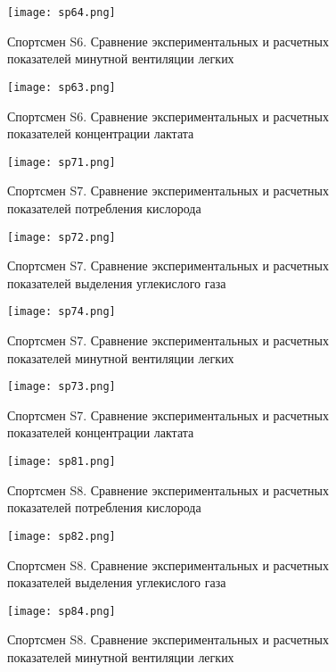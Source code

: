 \begin{figure}[!ht]
	\centering
	\texttt{[image: sp64.png]}
	\caption{Спортсмен S6. Сравнение экспериментальных и расчетных показателей минутной вентиляции легких} 
\end{figure}

\begin{figure}[!ht]
	\centering
	\texttt{[image: sp63.png]}
	\caption{Спортсмен S6. Сравнение экспериментальных и расчетных показателей концентрации лактата} 
\end{figure}

\begin{figure}[!ht]
	\centering
	\texttt{[image: sp71.png]}
	\caption{Спортсмен S7. Сравнение экспериментальных и расчетных показателей потребления кислорода } 
\end{figure}

\begin{figure}[!ht]
	\centering
	\texttt{[image: sp72.png]}
	\caption{Спортсмен S7. Сравнение экспериментальных и расчетных показателей выделения углекислого газа} 
\end{figure}

\begin{figure}[!ht]
	\centering
	\texttt{[image: sp74.png]}
	\caption{Спортсмен S7. Сравнение экспериментальных и расчетных показателей минутной вентиляции легких} 
\end{figure}

\begin{figure}[!ht]
	\centering
	\texttt{[image: sp73.png]}
	\caption{Спортсмен S7. Сравнение экспериментальных и расчетных показателей концентрации лактата} 
\end{figure}

\begin{figure}[!ht]
	\centering
	\texttt{[image: sp81.png]}
	\caption{Спортсмен S8. Сравнение экспериментальных и расчетных показателей потребления кислорода } 
\end{figure}

\begin{figure}[!ht]
	\centering
	\texttt{[image: sp82.png]}
	\caption{Спортсмен S8. Сравнение экспериментальных и расчетных показателей выделения углекислого газа} 
\end{figure}

\begin{figure}[!ht]
	\centering
	\texttt{[image: sp84.png]}
	\caption{Спортсмен S8. Сравнение экспериментальных и расчетных показателей минутной вентиляции легких} 
\end{figure}

